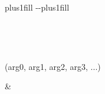 \documentclass[letterpaper,10pt,english]{sphinxmanual}
\begin{document}
\begin{savenotes}
\sphinxatlongtablestart
\sphinxthistablewithglobalstyle
\sphinxthistablewithnovlinesstyle
\makeatletter
  \LTleft \@totalleftmargin plus1fill
  \LTright\dimexpr\columnwidth-\@totalleftmargin-\linewidth\relax plus1fill
\makeatother
\begin{longtable}{}
\sphinxtoprule
\endfirsthead

\\
\sphinxtoprule
\endhead

\sphinxbottomrule
{}\\
\endfoot

\endlastfoot
\sphinxtableatstartofbodyhook
\begin{varwidth}[t]{}
\sphinxAtStartPar
{\hyperref[\detokenize{_autosummary/nirfasterff.lib.nirfasterff_cuda.gen_mass_matrix:nirfasterff.lib.nirfasterff_cuda.gen_mass_matrix}]{}}(arg0, arg1, arg2, arg3, ...)
\sphinxbeforeendvarwidth
\end{varwidth}%
&\begin{varwidth}[t]{}
\sphinxAtStartPar


\end{varwidth}
\end{longtable}
\end{savenotes}
\end{document}
